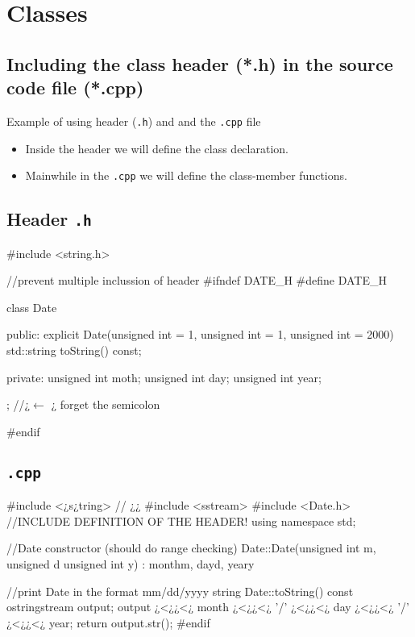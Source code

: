 \section{Classes}

\subsection{Including the class header (*.h) in the source code file (*.cpp)}
Example of using header (\texttt{.h}) and and the \texttt{.cpp} file\\
\begin{itemize}
    \item Inside the header we will define the class declaration.
    \item Mainwhile in the \texttt{.cpp} we will define the class-member functions.
\end{itemize}

\subsection{Header \texttt{.h}}
\begin{minipage}{\MPWxLARGExLISTING\textwidth} %
{} %
\begin{CPPCode}
#include <string.h>

//prevent multiple inclussion of header
#ifndef DATE_H
#define DATE_H

class Date{
public:
    explicit Date(unsigned int = 1, unsigned int = 1, unsigned int = 2000)
    std::string toString() const;
    
private:
    unsigned int moth;
    unsigned int day;
    unsigned int year;
}; //¿$\leftarrow$ ¿ forget the semicolon

#endif
\end{CPPCode}
\end{minipage}

\subsection{\texttt{.cpp}}
\begin{minipage}{\MPWxLARGExLISTING\textwidth} %
{} %
\begin{CPPCode}
#include <¿s¿tring> // ¿¿
#include <sstream>
#include <Date.h>   //INCLUDE DEFINITION OF THE HEADER!
using namespace std;

//Date constructor (should do range checking)
Date::Date(unsigned int m, unsigned d unsigned int y)
    : month{m}, day{d}, year{y} {}
    
//print Date in the format mm/dd/yyyy
string Date::toString() const {
    ostringstream output;
    output ¿<¿¿<¿ month ¿<¿¿<¿ '/' ¿<¿¿<¿ day ¿<¿¿<¿ '/' ¿<¿¿<¿ year;
    return output.str();
}
#endif
\end{CPPCode}
\end{minipage}

